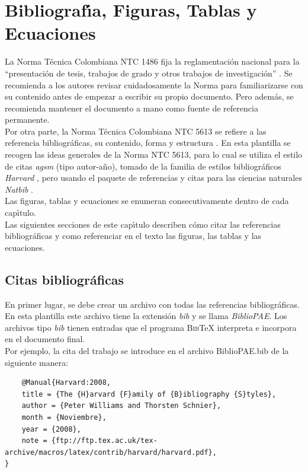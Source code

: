 \chapter{Bibliograf\'{\i}a, Figuras, Tablas y Ecuaciones}

La Norma T\'{e}cnica Colombiana NTC 1486 fija la reglamentaci\'{o}n nacional para la ``presentaci\'{o}n de tesis, trabajos de grado y otros trabajos de investigaci\'{o}n'' \citep{NTC1486}. Se recomienda a los autores revisar cuidadosamente la Norma para familiarizarse con su contenido antes de empezar a escribir su propio documento. Pero adem\'{a}s, se recomienda mantener el documento a mano como fuente de referencia permanente. \\

Por otra parte, la Norma T\'{e}cnica Colombiana NTC 5613 se refiere a las referencia bibliogr\'{a}ficas, su contenido, forma y estructura \citep{NTC5613}. En esta plantilla se recogen las ideas generales de la Norma NTC 5613, para lo cual se utiliza el estilo de citas \emph{agsm} (tipo autor-a\~{n}o), tomado de la familia de estilos bibliogr\'{a}ficos \emph{Harvard} \citep{Harvard:2008}, pero usando el paquete de referencias y citas para las ciencias naturales \emph{Natbib} \citep{Natbib:2010, Natbib:2010RS}. \\

Las figuras, tablas y ecuaciones se enumeran consecutivamente dentro de cada cap\'{\i}tulo. \\

Las siguientes secciones de este cap\'{\i}tulo describen c\'{o}mo citar las referencias bibliogr\'{a}ficas y como referenciar en el texto las figuras, las tablas y las ecuaciones.

\section{Citas bibliogr\'{a}ficas}

En primer lugar, se debe crear un archivo con todas las referencias bibliogr\'{a}ficas. En esta plantilla este archivo tiene la extensi\'{o}n \emph{bib} y se llama \emph{BiblioPAE}. Los archivos tipo \emph{bib} tienen entradas que el programa {\textsc{Bib}}{\TeX} interpreta e incorpora en el documento final. \\

Por ejemplo, la cita del trabajo \citet{Harvard:2008} se introduce en el archivo BiblioPAE.bib de la siguiente manera:

\begin{verbatim}
	@Manual{Harvard:2008,
	title = {The {H}arvard {F}amily of {B}ibliography {S}tyles},
	author = {Peter Williams and Thorsten Schnier},
	month = {Noviembre},
	year = {2008},
	note = {ftp://ftp.tex.ac.uk/tex-archive/macros/latex/contrib/harvard/harvard.pdf},
}
\end{verbatim}

